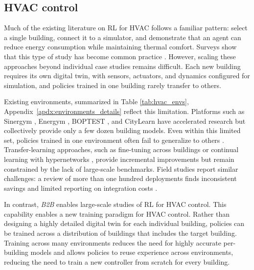 \documentclass[10pt]{article} %
\newcommand{\btob}{{\textit{B2B}}}
\begin{document}
\subsection{HVAC control}
Much of the existing literature on RL for HVAC follows a familiar pattern: select a single building, connect it to a simulator, and demonstrate that an agent can reduce energy consumption while maintaining thermal comfort. Surveys show that this type of study has become common practice \cite{sierla2022,slsayed2024}. However, scaling these approaches beyond individual case studies remains difficult. Each new building requires its own digital twin, with sensors, actuators, and dynamics configured for simulation, and policies trained in one building rarely transfer to others.

Existing environments, summarized in Table \ref{tab:hvac_envs}, Appendix~\ref{apdx:environments_details} reflect this limitation. Platforms such as Sinergym \cite{campoy2025}, Energym \cite{scharnhorst2021}, BOPTEST \cite{blum2021}, and CityLearn \cite{nweye2024} have accelerated research but collectively provide only a few dozen building models. Even within this limited set, policies trained in one environment often fail to generalize to others \cite{manjavacas2024}. Transfer-learning approaches, such as fine-tuning across buildings \citep{kadamala2024,xu2020,coraci2024} or continual learning with hypernetworks \citep{bekal2025}, provide incremental improvements but remain constrained by the lack of large-scale benchmarks. Field studies report similar challenges: a review of more than one hundred deployments finds inconsistent savings and limited reporting on integration costs \citep{habbazi2025}.

In contrast, \btob{} enables large-scale studies of RL for HVAC control. This capability enables a new training paradigm for HVAC control. Rather than designing a highly detailed digital twin for each individual building, policies can be trained across a distribution of buildings that includes the target building. Training across many environments reduces the need for highly accurate per-building models and allows policies to reuse experience across environments, reducing the need to train a new controller from scratch for every building.
\end{document}
